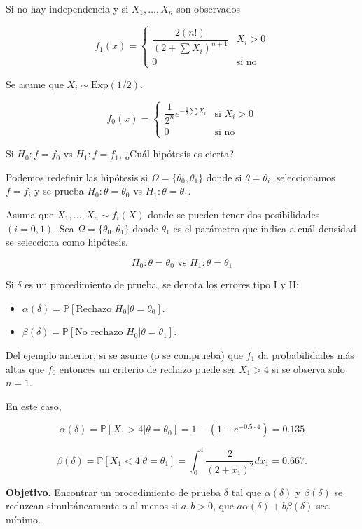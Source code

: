 \documentclass[
  12pt,
]{book}
\begin{document}
Si no hay independencia y si \(X_1,\dots, X_n\) son observados

\[f_1(x) = \begin{cases}\dfrac{2(n!)}{(2+\sum X_i)^{n+1}} & X_i>0\\0 & \text{si no}\end{cases}\]

Se asume que \(X_i\sim\text{Exp}(1/2)\).

\[f_0(x)=\begin{cases}\dfrac 1{2^n}e^{-\frac12\sum X_i} & \text{si }X_i>0\\0 & \text{si no} \end{cases}\]

Si \(H_0: f=f_0\) vs \(H_1:f=f_1\), ¿Cuál hipótesis es cierta?

Podemos redefinir las hipótesis si \(\Omega=\{\theta_0,\theta_1\}\) donde si \(\theta = \theta_i\), seleccionamos \(f = f_i\) y se prueba \(H_0: \theta=\theta_0\) vs \(H_1:\theta=\theta_1\).

Asuma que \(X_1,\dots,X_n\sim f_i(X)\) donde se pueden tener dos posibilidades \((i=0,1)\). Sea \(\Omega =\{\theta_0,\theta_1\}\) donde \(\theta_1\) es el parámetro que indica a cuál densidad se selecciona como hipótesis.

\[H_0: \theta=\theta_0 \text{ vs } H_1:\theta=\theta_1\]

Si \(\delta\) es un procedimiento de prueba, se denota los errores tipo I y II:

\begin{itemize}
\item
  \(\alpha(\delta) = \mathbb P[\text{Rechazo }H_0|\theta=\theta_0 ]\).
\item
  \(\beta(\delta) = \mathbb P[\text{No rechazo }H_0|\theta=\theta_1 ]\).
\end{itemize}

Del ejemplo anterior, si se asume (o se comprueba) que \(f_1\) da probabilidades más altas que \(f_0\) entonces un criterio de rechazo puede ser \(X_1>4\) si se observa solo \(n=1\).

En este caso,

\[\alpha(\delta) = \mathbb P[X_1>4|\theta=\theta_0] = 1-(1-e^{-0.5\cdot 4}) = 0.135\]

\[\beta(\delta) =  \mathbb P[X_1<4|\theta=\theta_1] = \int_{0}^{4}\dfrac2{(2+x_1)^2}dx_1=0.667.\]

\textbf{Objetivo}. Encontrar un procedimiento de prueba \(\delta\) tal que \(\alpha(\delta)\) y \(\beta(\delta)\) se reduzcan simultáneamente o al menos si \(a,b>0\), que \(a\alpha(\delta) + b\beta(\delta)\) sea mínimo.
\end{document}
